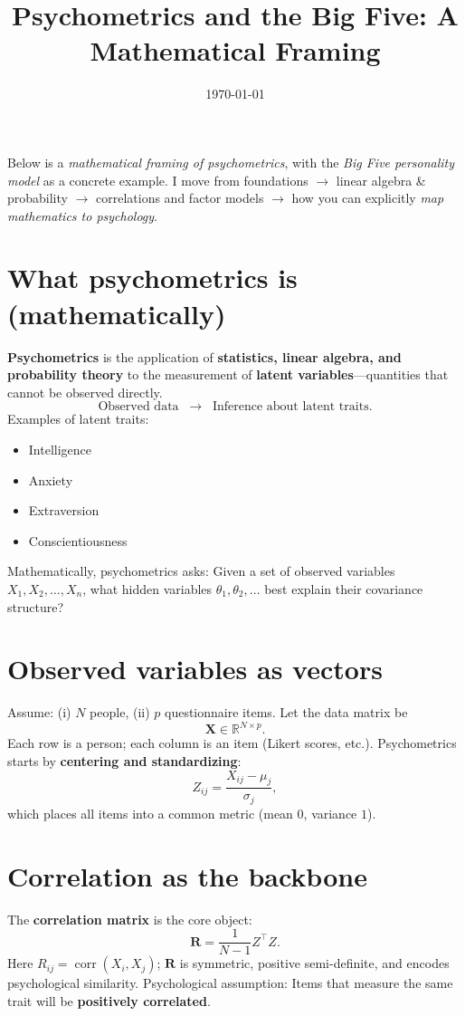 \documentclass[11pt]{article}
\title{Psychometrics and the Big Five: A Mathematical Framing}
\author{}
\date{\today}
\begin{document}
\maketitle

Below is a \emph{mathematical framing of psychometrics}, with the \emph{Big Five personality model} as a concrete example. I move from foundations $\to$ linear algebra \& probability $\to$ correlations and factor models $\to$ how you can explicitly \emph{map mathematics to psychology}.

\section{What psychometrics is (mathematically)}
\textbf{Psychometrics} is the application of \textbf{statistics, linear algebra, and probability theory} to the measurement of \textbf{latent variables}---quantities that cannot be observed directly.
\begin{equation}
\text{Observed data} \;\; \longrightarrow \;\; \text{Inference about latent traits}.
\end{equation}
Examples of latent traits:
\begin{itemize}
  \item Intelligence
  \item Anxiety
  \item Extraversion
  \item Conscientiousness
\end{itemize}
Mathematically, psychometrics asks: Given a set of observed variables $X_1, X_2, \dots, X_n$, what hidden variables $\theta_1, \theta_2, \dots$ best explain their covariance structure?

\section{Observed variables as vectors}
Assume: (i) $N$ people, (ii) $p$ questionnaire items. Let the data matrix be
\begin{equation}
\mathbf{X} \in \mathbb{R}^{N\times p}.
\end{equation}
Each row is a person; each column is an item (Likert scores, etc.). Psychometrics starts by \textbf{centering and standardizing}:
\begin{equation}
Z_{ij} = \frac{X_{ij}-\mu_j}{\sigma_j},
\end{equation}
which places all items into a common metric (mean $0$, variance $1$).

\section{Correlation as the backbone}
The \textbf{correlation matrix} is the core object:
\begin{equation}
\mathbf{R} = \frac{1}{N-1} Z^{\top} Z.
\end{equation}
Here $R_{ij} = \operatorname{corr}(X_i,X_j)$; $\mathbf{R}$ is symmetric, positive semi-definite, and encodes psychological similarity. Psychological assumption: Items that measure the same trait will be \textbf{positively correlated}.
\end{document}
